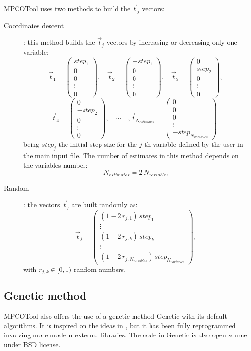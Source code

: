 \documentclass[review,authoryear]{elsarticle}
\newcommand{\EQ}[2]
{\begin{equation}#1\label{#2}\end{equation}}
\newcommand{\MATRIX}[2]{\PA{\begin{array}{#1}#2\end{array}}}
\newcommand{\PA}[1]{\left(#1\right)}
\begin{document}
MPCOTool uses two methods to build the $\vec{t}_j$ vectors:
\begin{description}
\item[Coordinates descent]: this method builds the $\vec{t}_j$ vectors by
increasing or decreasing only one variable:
\[
	\vec{t}_1=\MATRIX{c}{step_1\\0\\0\\\vdots\\0},\quad
	\vec{t}_2=\MATRIX{c}{-step_1\\0\\0\\\vdots\\0},\quad
	\vec{t}_3=\MATRIX{c}{0\\step_2\\0\\\vdots\\0},
\]
\EQ
{
	\vec{t}_4=\MATRIX{c}{0\\-step_2\\0\\\vdots\\0},\quad\cdots\quad,
	\vec{t}_{N_{estimates}}=\MATRIX{c}{0\\0\\0\\\vdots\\
	-step_{N_{variables}}},
}{EqtDescent}
being $step_j$ the initial step size for the $j$-th variable defined by the user
in the main input file. The number of estimates in this method depends on the
variables number:
\EQ{N_{estimates}=2\,N_{variables}}{EqNestimatesDescent}
\item[Random]: the vectors $\vec{t}_j$ are built randomly as:
\EQ
{
	\vec{t}_j=\MATRIX{c}{\PA{1-2\,r_{j,1}}\,step_1\\\vdots\\
	\PA{1-2\,r_{j,k}}\,step_k\\\vdots\\
	\PA{1-2\,r_{j,N_{variables}}}\,step_{N_{variables}}},
}{EqtRandom}
with $r_{j,k}\in[0,1)$ random numbers.
\end{description}

\subsection{Genetic method}

MPCOTool also offers the use of a genetic method Genetic \citep{genetic} with its default algorithms.
It is inspired on the ideas in \citet{gaul}, but it has been fully reprogrammed involving more modern external libraries.
The code in Genetic is also open source under BSD license.
\end{document}
